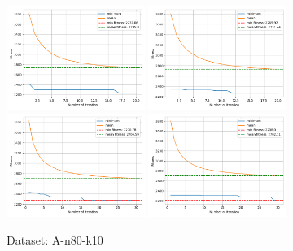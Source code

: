 \documentclass[12pt]{report}
\begin{document}
\begin{figure}[!ht]
	\centering
	\includegraphics[width=0.4\textwidth]{../CVRP/plots/A-n80-k10-20-20.png}
	\includegraphics[width=0.4\textwidth]{../CVRP/plots/A-n80-k10-20-30.png}
	\includegraphics[width=0.4\textwidth]{../CVRP/plots/A-n80-k10-30-20.png}
	\includegraphics[width=0.4\textwidth]{../CVRP/plots/A-n80-k10-30-30.png}
	\caption{Dataset: A-n80-k10}
	\label{fig:A-n80-k10}
\end{figure}
\end{document}
